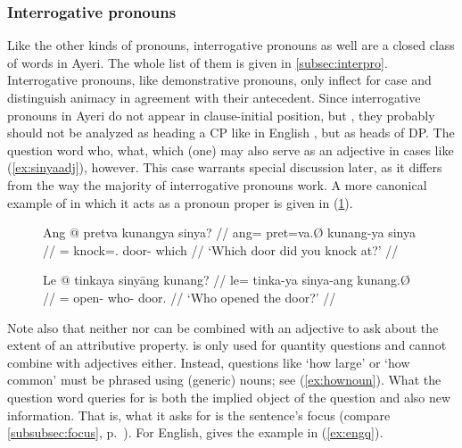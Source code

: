 
\subsubsection{Interrogative pronouns}

Like the other kinds of pronouns, interrogative pronouns as well are a closed
class of words in Ayeri. The whole list of them is given in
\autoref{subsec:interpro}. Interrogative pronouns, like demonstrative pronouns,
only inflect for case and distinguish animacy in agreement with their
antecedent. Since interrogative pronouns in Ayeri do not appear in
clause-initial position, but , they probably should not be analyzed
as heading a CP like in English \parencites[359--369]{carnie2013}[405--408]
{dalrymple2001}, but as heads of DP. The question word  {who,
what, which (one)} may also serve as an adjective in cases like
(\ref{ex:sinyaadj}), however. This case warrants special discussion later, as
it differs from the way the majority of interrogative pronouns work. A more
canonical example of  in which it acts as a pronoun proper is
given in (\ref{ex:sinyapro}).

\begin{figure}[h]
\pex
\a\label{ex:sinyaadj}%
\begingl
	\gla Ang @ pretva kunangya sinya? //
	\glb ang= pret=va.Ø kunang-ya sinya //
	\glc \AgtT{}= knock=\Second{}.\Top{} door-\Loc{} which //
	\glft `Which door did you knock at?' //
\endgl

\a\label{ex:sinyapro}%
\begingl
	\gla Le @ tinkaya sinyāng kunang? //
	\glb le= tinka-ya sinya-ang kunang.Ø //
	\glc \PatTI{}= open-\TsgM{} who-\Aarg{} door.\Top{} //
	\glft `Who opened the door?' //
\endgl
\xe
\end{figure}

Note also that neither  nor
 can be combined with an adjective to
ask about the extent of an attributive property.  is only used for quantity questions and cannot combine with
adjectives either. Instead, questions like `how large' or `how common' must be
phrased using (generic) nouns; see (\ref{ex:hownoun}). What the question word
queries for is both the implied object of the question and also new
information. That is, what it asks for is the sentence's focus (compare
\autoref{subsubsec:focus}, p.~\pageref{subsubsec:focus}). For English,
\citet{dalrymple2001} gives the example in (\ref{ex:engq}).

